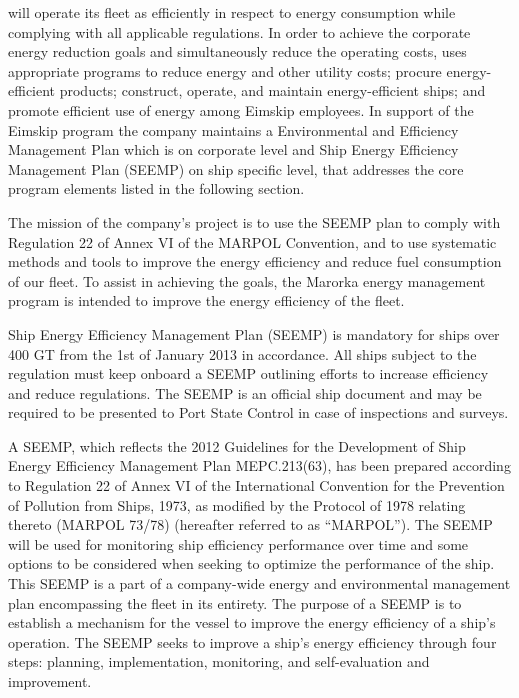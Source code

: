 \replaceCompany[%
] will operate its fleet as efficiently in respect to energy consumption while complying with all applicable regulations. In order to achieve the corporate energy reduction goals and simultaneously reduce the operating costs, \replaceCompany[%
] uses appropriate programs to reduce energy and other utility costs; procure energy-efficient products; construct, operate, and
maintain energy-efficient ships; and promote efficient use of energy among Eimskip employees. In
support of the Eimskip program the company maintains a Environmental and Efficiency
Management Plan which is on corporate level and Ship Energy Efficiency Management Plan
(SEEMP) on ship specific level, that addresses the core program elements listed in the following
section.

The mission of the company's project is to use the SEEMP plan to comply with Regulation 22 of
Annex VI of the MARPOL Convention, and to use systematic methods and tools to improve the
energy efficiency and reduce fuel consumption of our fleet.
To assist in achieving the goals, the Marorka energy management program is intended to improve
the energy efficiency of the fleet.

Ship Energy Efficiency Management Plan (SEEMP) is mandatory for ships over 400 GT from the
1st of January 2013 in accordance. All ships subject to the regulation must keep onboard a
SEEMP outlining efforts to increase efficiency and reduce regulations. The SEEMP is an official
ship document and may be required to be presented to Port State Control in case of inspections
and surveys.

A SEEMP, which reflects the 2012 Guidelines for the Development of Ship Energy Efficiency
Management Plan MEPC.213(63), has been prepared according to Regulation 22 of Annex VI of
the International Convention for the Prevention of Pollution from Ships, 1973, as modified by the
Protocol of 1978 relating thereto (MARPOL 73/78) (hereafter referred to as “MARPOL”).
The SEEMP will be used for monitoring ship efficiency performance over time and some options
to be considered when seeking to optimize the performance of the ship. This SEEMP is a part of
a company-wide energy and environmental management plan encompassing the fleet in its
entirety.
The purpose of a SEEMP is to establish a mechanism for the vessel to improve the energy
efficiency of a ship’s operation. The SEEMP seeks to improve a ship’s energy efficiency through
four steps: planning, implementation, monitoring, and self-evaluation and improvement.